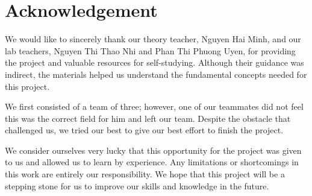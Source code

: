 \section{Acknowledgement}
\label{sec:acknowledgment-section}

\hspace{1cm} We would like to sincerely thank our theory teacher, Nguyen Hai Minh, and our lab teachers, Nguyen Thi Thao Nhi and Phan Thi Phuong Uyen, for providing the project and valuable resources for self-studying. Although their guidance was indirect, the materials helped us understand the fundamental concepts needed for this project.

\vspace{0.5cm}

\hspace{1cm} We first consisted of a team of three; however, one of our teammates did not feel this was the correct field for him and left our team. Despite the obstacle that challenged us, we tried our best to give our best effort to finish the project.

\vspace{0.5cm}

\hspace{1cm} We consider ourselves very lucky that this opportunity for the project was given to us and allowed us to learn by experience. Any limitations or shortcomings in this work are entirely our responsibility. We hope that this project will be a stepping stone for us to improve our skills and knowledge in the future.